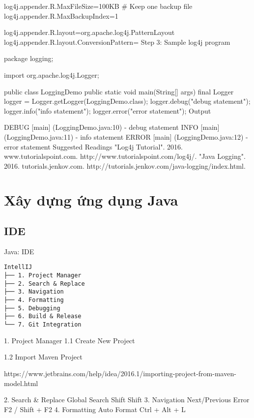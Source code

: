 log4j.appender.R.MaxFileSize=100KB
# Keep one backup file
log4j.appender.R.MaxBackupIndex=1

log4j.appender.R.layout=org.apache.log4j.PatternLayout
log4j.appender.R.layout.ConversionPattern=%
Step 3: Sample log4j program

package logging;

import org.apache.log4j.Logger;

public class LoggingDemo {
    public static void main(String[] args) {
        final Logger logger = Logger.getLogger(LoggingDemo.class);
        logger.debug("debug statement");
        logger.info("info statement");
        logger.error("error statement");
    }
}
Output

DEBUG [main] (LoggingDemo.java:10) - debug statement
 INFO [main] (LoggingDemo.java:11) - info statement
ERROR [main] (LoggingDemo.java:12) - error statement
Suggested Readings
"Log4j Tutorial". 2016. www.tutorialspoint.com. http://www.tutorialspoint.com/log4j/.
"Java Logging". 2016. tutorials.jenkov.com. http://tutorials.jenkov.com/java-logging/index.html.

\part{Xây dựng ứng dụng Java}

\chapter{IDE}

Java: IDE
\begin{lstlisting}
IntellIJ
├── 1. Project Manager
├── 2. Search & Replace
├── 3. Navigation
├── 4. Formatting
├── 5. Debugging
├── 6. Build & Release
└── 7. Git Integration
\end{lstlisting}

1. Project Manager
1.1 Create New Project

1.2 Import Maven Project

https://www.jetbrains.com/help/idea/2016.1/importing-project-from-maven-model.html

2. Search & Replace
Global Search	Shift Shift
3. Navigation
Next/Previous Error	F2 / Shift + F2
4. Formatting
Auto Format	Ctrl + Alt + L





















